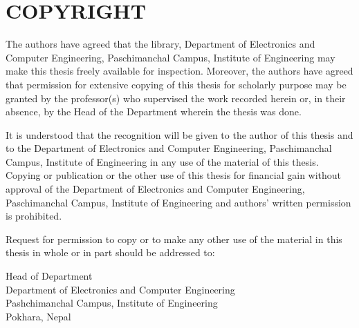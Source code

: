 \cleardoublepage
{}
\setcounter{page}{2}
\chapter*{COPYRIGHT}

\noindent The authors have agreed that the library, Department of Electronics and Computer Engineering, Paschimanchal Campus, Institute of Engineering may make this thesis freely available for inspection. Moreover, the authors have agreed that permission for extensive copying of this thesis for scholarly purpose may be granted by the professor(s) who supervised the work recorded herein or, in their absence, by the Head of the Department wherein the thesis was done. 

\noindent It is understood that the recognition will be given to the author of this thesis and to the Department of Electronics and Computer Engineering, Paschimanchal Campus, Institute of Engineering in any use of the material of this thesis. Copying or publication or the other use of this thesis for financial gain without approval of the Department of Electronics and Computer Engineering, Paschimanchal Campus, Institute of Engineering and authors' written permission is prohibited. 

\noindent Request for permission to copy or to make any other use of the material in this thesis in whole or in part should be addressed to:

\vspace{2em}
\noindent Head of Department\\
Department of Electronics and Computer Engineering\\
Pashchimanchal Campus, Institute of Engineering\\
Pokhara, Nepal